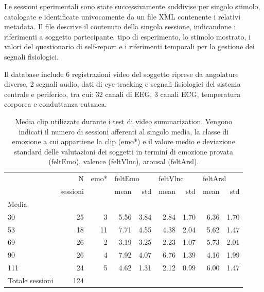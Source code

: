 Le sessioni sperimentali sono state successivamente suddivise per singolo stimolo, catalogate e identificate univocamente da un file XML contenente i relativi metadata. Il file descrive il contenuto della singola sessione, indicandone i riferimenti a soggetto partecipante, tipo di esperimento, lo stimolo mostrato, i valori del questionario di self-report e i riferimenti temporali per la gestione dei segnali fisiologici.

Il database include 6 registrazioni video del soggetto riprese da angolature diverse, 2 segnali audio, dati di eye-tracking e segnali fisiologici del sistema centrale e periferico, tra cui: 32 canali di EEG, 3 canali ECG, temperatura corporea e conduttanza cutanea.

\begin{table}[]
\centering
\begin{tabular}{lrrrrrrrr}
\toprule
{}         & N            & emo*   & \multicolumn{2}{l}{feltEmo} & \multicolumn{2}{l}{feltVlnc} & \multicolumn{2}{l}{feltArsl} \\
{}         & sessioni     & {}     &     mean &   std &     mean &   std &    mean &   std  \\
Media                     &        &          &       &          &       &         &        \\
\midrule
30         & 25           & 3      &     5.56 &  3.84 &     2.84 &  1.70 &    6.36 &  1.70  \\
53         & 18           & 11     &     7.71 &  4.55 &     4.38 &  2.04 &    5.62 &  1.47  \\
69         & 26           & 2      &     3.19 &  3.25 &     2.23 &  1.07 &    5.73 &  2.01  \\
90         & 26           & 4      &     7.92 &  4.07 &     6.76 &  1.39 &    4.16 &  1.99  \\
111        & 24           & 5      &     4.62 &  1.31 &     2.12 &  0.99 &    6.00 &  1.47  \\
\hline
Totale sessioni & 124   & & & & & & \\
\bottomrule
\end{tabular}
\caption{Media clip utilizzate durante i test di video summarization. Vengono indicati il numero di sessioni afferenti al singolo media, la classe di emozione a cui appartiene la clip (emo*) e il valore medio e deviazione standard delle valutazioni dei soggetti in termini di emozione provata (feltEmo), valence (feltVlnc), arousal (feltArsl).}
\label{tab:used_media}
\end{table}

